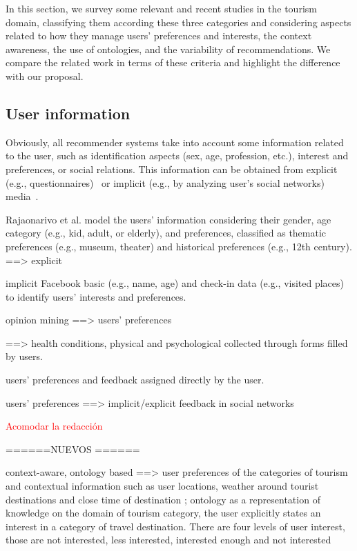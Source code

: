 In this section, we survey some relevant and recent studies in the tourism domain, classifying them according these three categories and considering aspects related to  how they manage users' preferences and interests, the context awareness, the use of ontologies, and the variability of recommendations. We compare the related work in terms of these criteria and highlight the difference with our proposal.    

\subsection{User information}
Obviously, all recommender systems take into account some information related to the user, such as identification aspects (sex, age, profession, etc.), interest and preferences, or social relations. This information can be obtained from explicit (e.g., questionnaires)~\cite{jannach2020interactive} or implicit (e.g., by analyzing user's social networks) media~\cite{lin2018hybrid}. 

Rajaonarivo et al.\cite{rajaonarivo2019rec} model the users' information considering their gender, age category (e.g., kid, adult, or elderly), and preferences, classified as thematic preferences (e.g., museum, theater) and historical preferences (e.g., 12th century).  ==> explicit 

\cite{kesorn2017personalized} implicit Facebook basic (e.g., name, age) and  check-in data (e.g., visited places)  to identify users' interests and preferences.  

\cite{logesh2019exploring,logesh2018personalised} opinion mining ==> users' preferences

\cite{santos2019using} ==> health conditions,  physical and psychological collected through forms filled by users.


\cite{bahramian_abbaspour_claramunt_2017} users' preferences and feedback assigned directly by the user.

\cite{hidasi2016general} users' preferences ==> implicit/explicit feedback in social networks

\textcolor{red}{Acomodar la redacción}

======NUEVOS ======

\cite{arigi2018context} context-aware, ontology based
==> user  preferences  of  the  categories  of  tourism  and contextual information such as user locations, weather around tourist destinations and close time of   destination ; ontology as a representation of knowledge on the domain of tourism  category, the  user explicitly  states  an interest in a category of travel destination. There are four levels of user interest, those are not interested, less interested, interested enough and not interested

